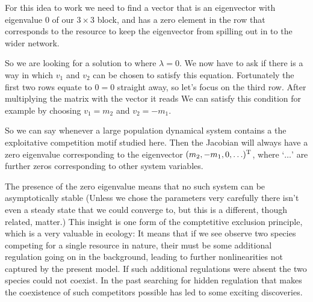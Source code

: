 For this idea to work we need to find a vector that is an eigenvector with eigenvalue 0 of our $3 \times 3$ block, and has a zero element in the row that corresponds to the resource to keep the eigenvector from spilling out in to the wider network. 

So we are looking for a solution to 
where $\lambda=0$. We now have to ask if there is a way in which $v_1$ and $v_2$ can be chosen to satisfy this equation. Fortunately the first two rows equate to $0=0$ straight away, so let's focus on the third row. After multiplying the matrix with the vector it reads
We can satisfy this condition for example by choosing $v_1=m_2$ and $v_2=-m_1$.

So we can say whenever a large population dynamical system contains a the exploitative competition motif studied here. Then the Jacobian will always have a zero eigenvalue corresponding to the eigenvector $(m_2,-m_1,0,\ldots)^{\rm T}$, where `$\ldots$' are further zeros corresponding to other system variables.

The presence of the zero eigenvalue means that no such system can be asymptotically stable (Unless we chose the parameters very carefully there isn't even a steady state that we could converge to, but this is a different, though related, matter.) This insight is one form of the comptetitive exclusion principle, which is a very valuable in ecology: It means that if we see observe two species competing for a single resource in nature, their must be some additional regulation going on in the background, leading to further nonlinearities not captured by the present model. If such additional regulations were absent the two species could not coexist. In the past searching for hidden regulation that makes the coexistence of such competitors possible has led to some exciting discoveries. 






